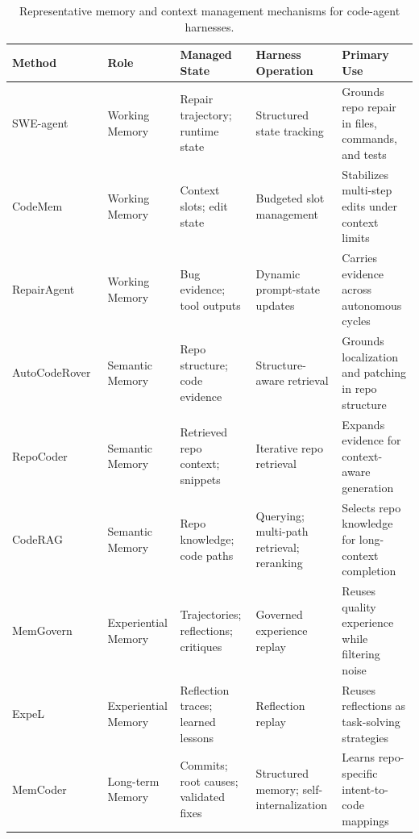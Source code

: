 \begin{table}[t!]
\centering
\caption{Representative memory and context management mechanisms for code-agent harnesses.}
\renewcommand{\arraystretch}{1.00}
\setlength{\tabcolsep}{3.5pt}
\scriptsize
\begin{tabularx}{\textwidth}{p{2.35cm}p{2.5cm}p{3.2cm}p{2.8cm}X}
\toprule
\textbf{Method} & \textbf{Role} & \textbf{Managed State} & \textbf{Harness Operation} & \textbf{Primary Use} \\
\midrule
SWE-agent~\cite{yang2024swe} 
& Working Memory 
& Repair trajectory; runtime state
& Structured state tracking 
& Grounds repo repair in files, commands, and tests \\

CodeMem~\cite{gaurav2025codemem} 
& Working Memory 
& Context slots; edit state
& Budgeted slot management
& Stabilizes multi-step edits under context limits \\

RepairAgent~\cite{bouzenia2025repairagent}
& Working Memory 
& Bug evidence; tool outputs
& Dynamic prompt-state updates
& Carries evidence across autonomous cycles \\
\midrule

AutoCodeRover~\cite{zhang2024autocoderover} 
& Semantic Memory 
& Repo structure; code evidence
& Structure-aware retrieval 
& Grounds localization and patching in repo structure \\

RepoCoder~\cite{zhang2023repocoder} 
& Semantic Memory 
& Retrieved repo context; snippets
& Iterative repo retrieval 
& Expands evidence for context-aware generation \\

CodeRAG~\cite{zhang2025coderag} 
& Semantic Memory 
& Repo knowledge; code paths
& Querying; multi-path retrieval; reranking
& Selects repo knowledge for long-context completion \\
\midrule

MemGovern~\cite{wang2026memgovern} 
& Experiential Memory 
& Trajectories; reflections; critiques
& Governed experience replay
& Reuses quality experience while filtering noise \\

ExpeL~\cite{zhao2024expel} 
& Experiential Memory 
& Reflection traces; learned lessons
& Reflection replay
& Reuses reflections as task-solving strategies \\
\midrule

MemCoder~\cite{deng2026your}
& Long-term Memory 
& Commits; root causes; validated fixes
& Structured memory; self-internalization
& Learns repo-specific intent-to-code mappings \\


\end{tabularx}
\end{table}
